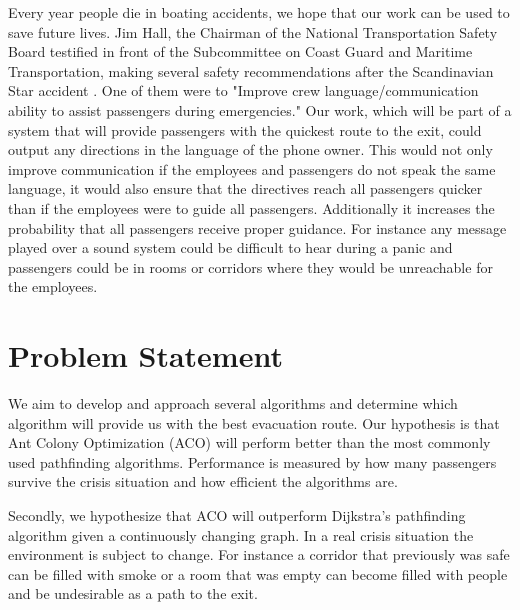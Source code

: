Every year people die in boating accidents, we hope that our work can be                                                                         
used to save future lives. Jim Hall, the Chairman of the National Transportation 
Safety Board testified in front of the Subcommittee on Coast Guard and Maritime 
Transportation, making several safety recommendations after the Scandinavian Star
accident \cite{ntsb}. One of them were to "Improve crew language/communication 
ability to assist passengers during emergencies." Our work, which will be part of a system
that will provide passengers with the quickest route to the exit, could output 
any directions in the language of the phone owner. This would not only improve 
communication if the employees and passengers do not speak the same language, 
it would also ensure that the directives reach all passengers quicker than if the employees 
were to guide all passengers. Additionally it increases the probability that all passengers 
receive proper guidance. For instance any message played over a sound system could be
difficult to hear during a panic and passengers could be in rooms or corridors
where they would be unreachable for the employees.



\section{Problem Statement}

We aim to develop and approach several algorithms and determine which algorithm will provide us with the         
best evacuation route. Our hypothesis is that Ant Colony Optimization (ACO) will perform better than the 
most commonly used pathfinding algorithms. Performance is measured by how many passengers 
survive the crisis situation and how efficient the algorithms are. 

Secondly, we hypothesize that ACO will outperform Dijkstra's pathfinding algorithm       
given a continuously changing graph. In a real crisis situation the environment is subject
to change. For instance a corridor that previously was safe can be filled with smoke
or a room that was empty can become filled with people and be undesirable as a path
to the exit.

